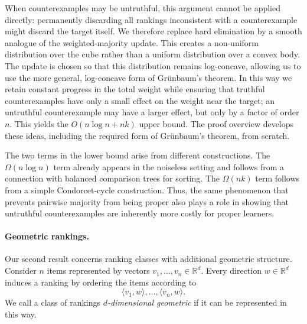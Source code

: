 \documentclass[11pt]{article}
\theoremstyle{definition}
\theoremstyle{remark}
\begin{document}
When counterexamples may be untruthful, this argument cannot be applied
directly: permanently discarding all rankings inconsistent with a
counterexample might discard the target itself. We therefore replace hard
elimination by a smooth analogue of the weighted-majority update. This
creates a non-uniform distribution over the cube rather than a uniform
distribution over a convex body. The update is chosen so that this
distribution remains log-concave, allowing us to use the more general,
log-concave form of Gr\"unbaum's theorem. In this way we retain constant
progress in the total weight while ensuring that truthful counterexamples
have only a small effect on the weight near the target; an untruthful
counterexample may have a larger effect, but only by a factor of order $n$.
This yields the $O(n\log n+nk)$ upper bound. The proof overview develops
these ideas, including the required form of Gr\"unbaum's theorem, from
scratch.

The two terms in the lower bound arise from different constructions. The
$\Omega(n\log n)$ term already appears in the noiseless setting and follows
from a connection with balanced comparison trees for sorting. The
$\Omega(nk)$ term follows from a simple Condorcet-cycle construction. Thus,
the same phenomenon that prevents pairwise majority from being proper also
plays a role in showing that untruthful counterexamples are inherently more
costly for proper learners.

\paragraph{Geometric rankings.}
Our second result concerns ranking classes with additional geometric
structure. Consider $n$ items represented by vectors
$v_1,\ldots,v_n\in\mathbb R^d$. Every direction $w\in\mathbb R^d$
induces a ranking by ordering the items according to
\[
    \langle v_1,w\rangle,\ldots,\langle v_n,w\rangle.
\]
We call a class of rankings \emph{$d$-dimensional geometric} if it can be
represented in this way.
\end{document}
